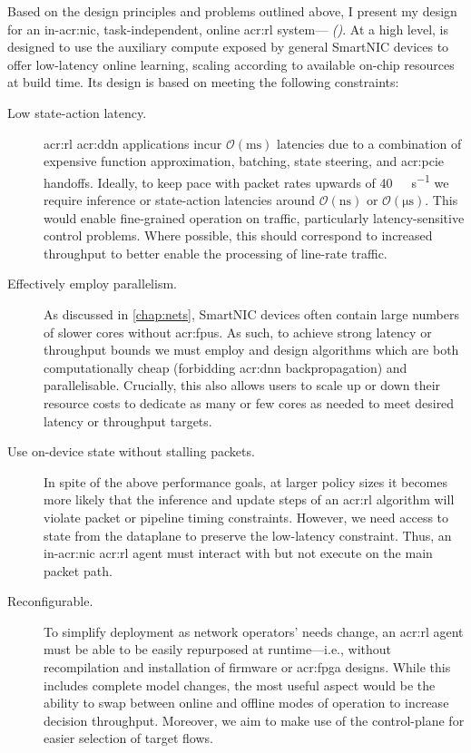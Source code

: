 Based on the design principles and problems outlined above, I present my design for an in-\gls{acr:nic}, task-independent, online \gls{acr:rl} system---\emph{\approachshort{} (\approach)}.
At a high level, \approachshort{} is designed to use the auxiliary compute exposed by general SmartNIC devices to offer low-latency online learning, scaling according to available on-chip resources at build time.
Its design is based on meeting the following constraints:
\begin{description}
	\item[Low state-action latency.] \gls{acr:rl} \gls{acr:ddn} applications incur $\mathcal{O}\left(\unit{\milli\second}\right)$ latencies due to a combination of expensive function approximation, batching, state steering, and \gls{acr:pcie} handoffs. Ideally, to keep pace with packet rates upwards of \qty{40}{\giga\bit\per\second} we require inference or state-action latencies around $\mathcal{O}\left(\unit{\nano\second}\right)$ or $\mathcal{O}\left(\unit{\micro\second}\right)$. This would enable fine-grained operation on traffic, particularly latency-sensitive control problems. Where possible, this should correspond to increased throughput to better enable the processing of line-rate traffic.
	
	\item[Effectively employ parallelism.] As discussed in \cref{chap:nets}, SmartNIC devices often contain large numbers of slower cores without \glspl{acr:fpu}. As such, to achieve strong latency or throughput bounds we must employ and design algorithms which are both computationally cheap (forbidding \gls{acr:dnn} backpropagation) and parallelisable. Crucially, this also allows users to scale up or down their resource costs to dedicate as many or few cores as needed to meet desired latency or throughput targets.
	
	\item[Use on-device state without stalling packets.] In spite of the above performance goals, at larger policy sizes it becomes more likely that the inference and update steps of an \gls{acr:rl} algorithm will violate packet or pipeline timing constraints. However, we need access to state from the dataplane to preserve the low-latency constraint. Thus, an in-\gls{acr:nic} \gls{acr:rl} agent must interact with but not execute on the main packet path.
	
	\item[Reconfigurable.] To simplify deployment as network operators' needs change, an \approachshort{} \gls{acr:rl} agent must be able to be easily repurposed at runtime---i.e., without recompilation and installation of firmware or \gls{acr:fpga} designs. While this includes complete model changes, the most useful aspect would be the ability to swap between online and offline modes of operation to increase decision throughput. Moreover, we aim to make use of the control-plane for easier selection of target flows.
	

\end{description}

